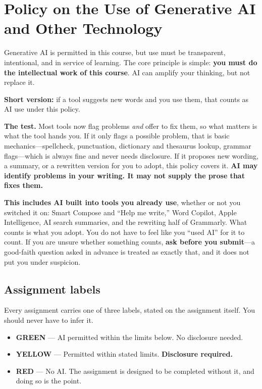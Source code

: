 \documentclass[12pt]{article}
\begin{document}
\section*{Policy on the Use of Generative AI and Other Technology}

Generative AI is permitted in this course, but use must be transparent, intentional, and in service of learning. The core principle is simple: \textbf{you must do the intellectual work of this course}. AI can amplify your thinking, but not replace it.

\vspace{0.5em}
\noindent\textbf{Short version:} if a tool suggests new words and you use them, that counts as AI use under this policy.

\vspace{0.5em}
\noindent \textbf{The test.} Most tools now flag problems \emph{and} offer to fix them, so what matters is what the tool hands you. If it only flags a possible problem, that is basic mechanics---spellcheck, punctuation, dictionary and thesaurus lookup, grammar flags---which is always fine and never needs disclosure. If it proposes new wording, a summary, or a rewritten version for you to adopt, this policy covers it. \textbf{AI may identify problems in your writing. It may not supply the prose that fixes them.}

\vspace{0.5em}
\noindent \textbf{This includes AI built into tools you already use}, whether or not you switched it on: Smart Compose and ``Help me write,'' Word Copilot, Apple Intelligence, AI search summaries, and the rewriting half of Grammarly. What counts is what you adopt. You do not have to feel like you ``used AI'' for it to count. If you are unsure whether something counts, \textbf{ask before you submit}---a good-faith question asked in advance is treated as exactly that, and it does not put you under suspicion.

\subsection*{Assignment labels}

Every assignment carries one of three labels, stated on the assignment itself. You should never have to infer it.

\begin{itemize}
\item \textbf{GREEN} --- AI permitted within the limits below. No disclosure needed.
\item \textbf{YELLOW} --- Permitted within stated limits. \textbf{Disclosure required.}
\item \textbf{RED} --- No AI. The assignment is designed to be completed without it, and doing so is the point.
\end{itemize}
\end{document}
